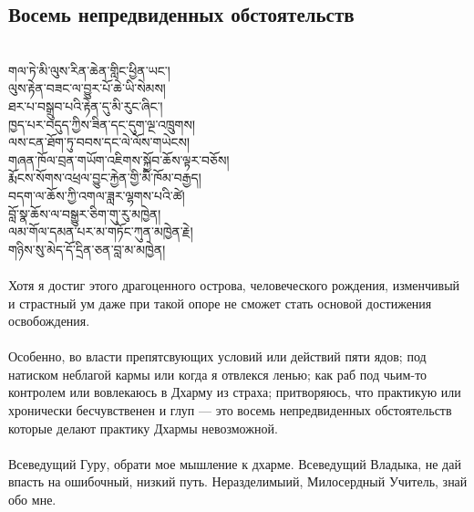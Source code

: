 \subsection*{Восемь непредвиденных обстоятельств}
\\
\ti
གལ་ཏེ་མི་ལུས་རིན་ཆེན་གླིང་ཕྱིན་ཡང༌།\\
ལུས་རྟེན་བཟང་ལ་བྱུར་པོ་ཆེ་ཡི་སེམས། \\
ཐར་པ་བསྒྲུབ་པའི་རྟེན་དུ་མི་རུང་ཞིང༌། \\
ཁྱད་པར་བདུད་ཀྱིས་ཟིན་དང་དུག་ལྔ་འཁྲུགས། \\
ལས་ངན་ཐོག་ཏུ་བབས་དང་ལེ་ལོས་གཡེངས། \\
གཞན་ཁོལ་བྲན་གཡོག་འཇིགས་སྐྱོབ་ཆོས་ལྟར་བཅོས། \\
རྨོངས་སོགས་འཕྲལ་བྱུང་རྐྱེན་གྱི་མི་ཁོམ་བརྒྱད། \\
བདག་ལ་ཆོས་ཀྱི་འགལ་ཟླར་ལྷགས་པའི་ཚེ། \\
བློ་སྣ་ཆོས་ལ་བསྒྱུར་ཅིག་གུ་རུ་མཁྱེན། \\
ལམ་གོལ་དམན་པར་མ་གཏོང་ཀུན་མཁྱེན་རྗེ། \\
གཉིས་སུ་མེད་དོ་དྲིན་ཅན་བླ་མ་མཁྱེན། \\
\\
\ru
\noindent
Хотя я достиг этого драгоценного острова, человеческого рождения,
изменчивый и страстный ум даже при такой опоре
не сможет стать основой достижения освобождения.\\
\\
Особенно, во власти препятсвующих условий или действий пяти ядов;
под натиском неблагой кармы или когда я отвлекся ленью;
как раб под чьим-то контролем или вовлекаюсь в Дхарму из страха;
притворяюсь, что практикую или хронически бесчув\-ственен и глуп
— это восемь непредвиденных обстоятельств которые
делают практику Дхармы невозможной.\\
\\
Всеведущий Гуру, обрати мое мышление к дхарме.
Всеведущий Владыка, не дай впасть на ошибочный, низкий путь.
Нераздели\-мыий, Милосердный Учитель, знай обо мне.

\newpage
